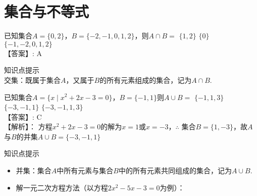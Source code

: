 \section{集合与不等式}
  \begin{exercise}
    \item %
      已知集合$A=\{0,2\}$，$B=\{-2,-1,0,1,2\}$，则$A\cap B=$\xz
       {$\{1,2\}$}
       {$\{0\}$}
       {$\{-1,-2,0,1,2\}$}
        \\{\heiti 【答案】:}
          A
        \begin{framed}{\heiti 知识点提示}\\
          {\fangsong 交集}：既属于集合$A$，又属于$B$的所有元素组成的集合，记为$A\cap B$.
            \\\eg{
             $\{1,2,3\}\cap \{2,3,5\}=\{2,3\}$；$[2,+\infty)\cap[-1,3)=[2,3)$.
             }
        \end{framed}
    \item %
      已知集合$A=\{x\mid x^2+2x-3=0\}$，$B=\{-1,1\}$则$A\cup B=$\xz
       {$\{-1,1,3\}$}
       {$\{-3,-1,1\}$}
       {$\{-3,-1,1,3\}$}
        \\{\heiti 【答案】:}
          C
        \\{\heiti 【解析】：}
          方程$x^2+2x-3=0$的解为$x=1$或$x=-3$，$\therefore$ 集合$B=\{1,-3\}$，故$A$与$B$的并集$A\cup B=\{-3,-1,1\}$
        \begin{framed}{\heiti 知识点提示}
          \begin{itemize}
            \item {\fangsong 并集}：集合$A$中所有元素与集合$B$中的所有元素共同组成的集合，记为$A\cup B$.
             \\\eg{
              $\{1,2,3\}\cup \{2,3,5\}=\{1,2,3,5\}$；$[2,+\infty)\cup[-1,3)=[-1,+\infty)$.
              }
            \item 解一元二次方程方法（以方程$2x^2-5x-3=0$为例）：\par
              \hspace{-2.5em}

\end{itemize}
\end{framed}
\end{exercise}
